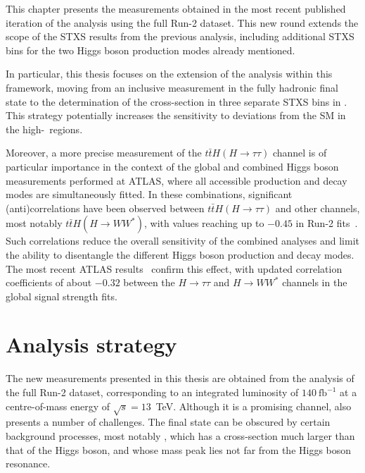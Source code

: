 This chapter presents the measurements obtained in the most recent published iteration of the \htautau analysis using the full Run-2 dataset. This new round extends the scope of the STXS results from the previous analysis, including additional STXS bins for the two Higgs boson production modes already mentioned.  

In particular, this thesis focuses on the extension of the \ttH analysis within this framework, moving from an inclusive measurement in the fully hadronic final state to the determination of the cross-section in three separate STXS bins in \pth. This strategy potentially increases the sensitivity to deviations from the SM in the high-\pt\ regions.  

Moreover, a more precise measurement of the $t\bar{t}H(H\to\tau\tau)$ channel is of particular importance in the context of the global and combined Higgs boson measurements performed at ATLAS, where all accessible production and decay modes are simultaneously fitted. In these combinations, significant (anti)correlations have been observed between $t\bar{t}H(H\to\tau\tau)$ and other channels, most notably $t\bar{t}H(H\to WW^*)$, with values reaching up to $-0.45$ in Run-2 fits~\cite{Aad_2020_combined}. Such correlations reduce the overall sensitivity of the combined analyses and limit the ability to disentangle the different Higgs boson production and decay modes. The most recent ATLAS results~\cite{Nature_ATLAS} confirm this effect, with updated correlation coefficients of about $-0.32$ between the $H\to\tau\tau$ and $H\to WW^*$ channels in the global signal strength fits.


\section{Analysis strategy}
\label{sec:analysis_strategy}

The new measurements presented in this thesis are obtained from the analysis of the full Run-2 dataset, corresponding to an integrated luminosity of $140~\text{fb}^{-1}$ at a centre-of-mass energy of $\sqrt{s}=13$~TeV. Although it is a promising channel, \htautau also presents a number of challenges. The final state can be obscured by certain background processes, most notably \ztautau, which has a cross-section much larger than that of the Higgs boson, and whose mass peak lies not far from the Higgs boson resonance.  


